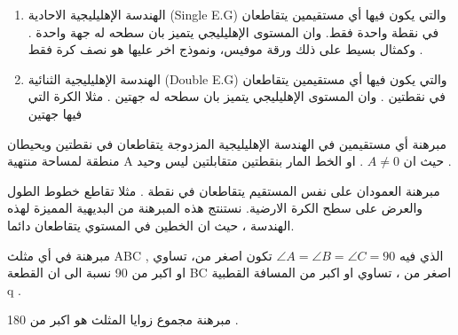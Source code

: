 		\begin{frame}
			
			\begin{enumerate}
				\item  الهندسة الإهليليجية الاحادية (Single E.G) والتي يكون فيها أي مستقيمين يتقاطعان في نقطة واحدة فقط. وان المستوى الإهليليجي يتميز بان سطحه له جهة واحدة . وكمثال بسيط على ذلك ورقة موفيس، ونموذج اخر عليها هو نصف كرة فقط .
				
				\item  الهندسة الإهليليجية الثنائية (Double E.G) والتي يكون فيها أي مستقيمين يتقاطعان في نقطتين . وان المستوى الإهليليجي يتميز بان سطحه له جهتين . مثلا الكرة التي فيها جهتين
			\end{enumerate}
		\end{frame}
		
		\begin{frame}
			\begin{exampleblock}{مبرهنة}
				أي مستقيمين في الهندسة الإهليليجية المزدوجة يتقاطعان في نقطتين ويحيطان منطقة لمساحة منتهية A حيث ان $A \neq 0$ . او الخط المار بنقطتين متقابلتين ليس وحيد .
			\end{exampleblock}
			
			\begin{exampleblock}{مبرهنة}
				العمودان على نفس المستقيم يتقاطعان في نقطة . مثلا تقاطع خطوط الطول والعرض على سطح الكرة الارضية.
				نستنتج هذه المبرهنة من البديهية المميزة لهذه الهندسة ، حيث ان الخطين في المستوي يتقاطعان دائما.
			\end{exampleblock}
			
			\begin{exampleblock}{مبرهنة}
				في أي مثلث ABC , الذي فيه $\angle A = \angle B = \angle C = 90$ تكون اصغر من، تساوي او اكبر من 90 نسبة الى ان القطعة BC اصغر من ، تساوي او اكبر من المسافة القطبية q .
			\end{exampleblock}
			
			\begin{exampleblock}{مبرهنة}
				مجموع زوايا المثلث هو اكبر من 180 .
			\end{exampleblock}
		\end{frame}
		
